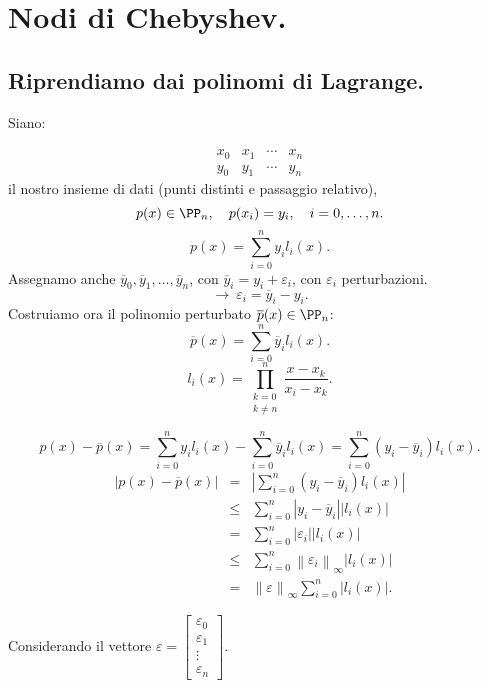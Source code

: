 \section{Nodi di Chebyshev.}

\subsection*{Riprendiamo dai polinomi di Lagrange.}
Siano:

\[\begin{array}{ccccc}
x_0 & x_1 & \cdots & x_n   \\
y_0 & y_1 & \cdots & y_n  
\end{array}\]
il nostro insieme di dati (punti distinti e passaggio relativo),
\[p(x) \in \PP_n, \quad p(x_i) = y_i, \quad i = 0,\ldots, n.\]
\[p(x) = \sum_{i = 0}^{n}y_il_i(x).\]
Assegnamo anche $\overline{y}_0, \overline{y}_1, \ldots, \overline{y}_n$, con
$\overline{y}_i = y_i + \varepsilon_i$, con $\varepsilon_i$ perturbazioni.
\[\longrightarrow\ \varepsilon_i = \overline{y}_i -y_i.\]
Costruiamo ora il polinomio perturbato $\overline{p}(x) \in \PP_n$:
\[\overline{p}(x) = \sum_{i = 0}^n\overline{y}_il_i(x).\]
\[l_i(x) = \prod_{\substack{k=0\\ k \neq n }}^n\frac{x-x_k}{x_i-x_k}.\]

\[p(x) - \overline{p}(x) = \sum_{i = 0}^{n}y_il_i(x) - 
\sum_{i = 0}^{n}\overline{y}_il_i(x) = \sum_{i=0}^n(y_i - \overline{y}_i)l_i(x).\]
\[
\begin{array}{lcl}
\left| p(x) - \overline{p}(x)\right| & = & \left| \sum_{i=0}^n(y_i - 
\overline{y}_i)l_i(x)\right| \\
& \leq & \sum_{i=0}^n\left|y_i - \overline{y}_i\right|\left|l_i(x)\right| \\
& = & \sum_{i=0}^n\left|\varepsilon_i\right|\left|l_i(x)\right| \\
& \leq & \sum_{i=0}^n\left\|\varepsilon_i\right\|_{\infty}\left|l_i(x)\right| \\
& = & \left\|\varepsilon\right\|_{\infty}\sum_{i=0}^n\left|l_i(x)\right|.
\end{array}
\]

\begin{center}
Considerando il vettore
$\varepsilon = \left[
\begin{array}{c}
\varepsilon_0 \\
\varepsilon_1 \\
\vdots \\
\varepsilon_n
\end{array}
\right].
$
\end{center}

